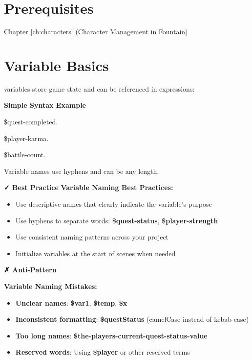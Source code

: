 \documentclass[11pt,letterpaper,oldstylefigures]{memoir}
\newcommand{\stagedir}[1]{#1\par\vspace{1\baselineskip}}
\newenvironment{FountainExample}
  {\begingroup
  \ttfamily\small
   \setlength{\parindent}{0pt}
  \setlength{\parskip}{0.5em}
  \allowdisplaybreaks
  \setlength{\displaywidowpenalty}{0}
  \setlength{\widowpenalty}{0}
  \setlength{\clubpenalty}{0}
  \setlength{\interlinepenalty}{0}
}
  {\endgroup}
\newenvironment{AntiPattern}
{\begingroup
\small
\setlength{\parindent}{0pt}
\setlength{\parskip}{0.5em}
\allowdisplaybreaks
\setlength{\displaywidowpenalty}{0}
\setlength{\widowpenalty}{0}
\setlength{\clubpenalty}{0}
\setlength{\interlinepenalty}{0}
\begin{tcolorbox}[
    colback=red!5,
    colframe=red!75!black,
    boxrule=0.5pt,
    arc=2pt,
    left=0.5em,
    right=0.5em,
    top=0.25em,
    bottom=0.25em
]
\textbf{✗ Anti-Pattern}
\end{tcolorbox}\par
}
{\endgroup}
\newenvironment{SimpleExample}
{\begingroup
\small
\setlength{\parindent}{0pt}
\setlength{\parskip}{0.5em}
\allowdisplaybreaks
\setlength{\displaywidowpenalty}{0}
\setlength{\widowpenalty}{0}
\setlength{\clubpenalty}{0}
\setlength{\interlinepenalty}{0}
\begin{tcolorbox}[
    colback=blue!5,
    colframe=blue!75!black,
    boxrule=0.5pt,
    arc=2pt,
    left=0.5em,
    right=0.5em,
    top=0.25em,
    bottom=0.25em
]
\textbf{Simple Syntax Example}
\end{tcolorbox}\par
}
{\endgroup}
\newcommand{\paragraphbreak}{\vspace{0.5em}}
\newcommand{\fountain}[1]{\textbf{#1}}
\begin{document}
\section{Prerequisites}
Chapter \ref{ch:characters} (Character Management in Fountain)

\section{Variable Basics}
\paragraphbreak

\gls{variable}s store game state and can be referenced in expressions:

\begin{SimpleExample}
\begin{FountainExample}
\stagedir{\$quest-completed.}
\stagedir{\$player-karma.}
\stagedir{\$battle-count.}
\end{FountainExample}
\end{SimpleExample}

Variable names use hyphens and can be any length.

\textbf{✓ Best Practice}
\textbf{Variable Naming Best Practices:}
\begin{itemize}
\item Use descriptive names that clearly indicate the variable's purpose
\item Use hyphens to separate words: \fountain{\$quest-status}, \fountain{\$player-strength}
\item Use consistent naming patterns across your project
\item Initialize variables at the start of scenes when needed
\end{itemize}


\begin{AntiPattern}
\textbf{Variable Naming Mistakes:}
\begin{itemize}
\item \textbf{Unclear names}: \fountain{\$var1}, \fountain{\$temp}, \fountain{\$x}
\item \textbf{Inconsistent formatting}: \fountain{\$questStatus} (camelCase instead of kebab-case)
\item \textbf{Too long names}: \fountain{\$the-players-current-quest-status-value}
\item \textbf{Reserved words}: Using \fountain{\$player} or other reserved terms
\end{itemize}
\end{AntiPattern}
\end{document}
